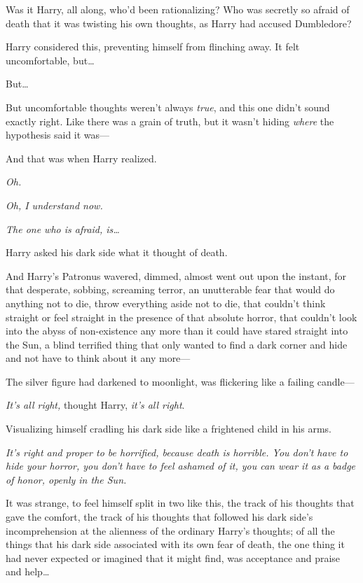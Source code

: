 Was it Harry, all along, who'd been rationalizing? Who was secretly so afraid of death that it was twisting his own thoughts, as Harry had accused Dumbledore?

Harry considered this, preventing himself from flinching away. It felt uncomfortable, but{\ldots}

But{\ldots}

But uncomfortable thoughts weren't always \emph{true}, and this one didn't sound exactly right. Like there was a grain of truth, but it wasn't hiding \emph{where} the hypothesis said it was—

And that was when Harry realized.

\emph{Oh.}

\emph{Oh, I understand now.}

\emph{The one who is afraid, is{\ldots}}

Harry asked his dark side what it thought of death.

And Harry's Patronus wavered, dimmed, almost went out upon the instant, for that desperate, sobbing, screaming terror, an unutterable fear that would do anything not to die, throw everything aside not to die, that couldn't think straight or feel straight in the presence of that absolute horror, that couldn't look into the abyss of non-existence any more than it could have stared straight into the Sun, a blind terrified thing that only wanted to find a dark corner and hide and not have to think about it any more—

The silver figure had darkened to moonlight, was flickering like a failing candle—

\emph{It's all right,} thought Harry, \emph{it's all right}.

Visualizing himself cradling his dark side like a frightened child in his arms.

\emph{It's right and proper to be horrified, because death is horrible. You don't have to hide your horror, you don't have to feel ashamed of it, you can wear it as a badge of honor, openly in the Sun.}

It was strange, to feel himself split in two like this, the track of his thoughts that gave the comfort, the track of his thoughts that followed his dark side's incomprehension at the alienness of the ordinary Harry's thoughts; of all the things that his dark side associated with its own fear of death, the one thing it had never expected or imagined that it might find, was acceptance and praise and help{\ldots}

